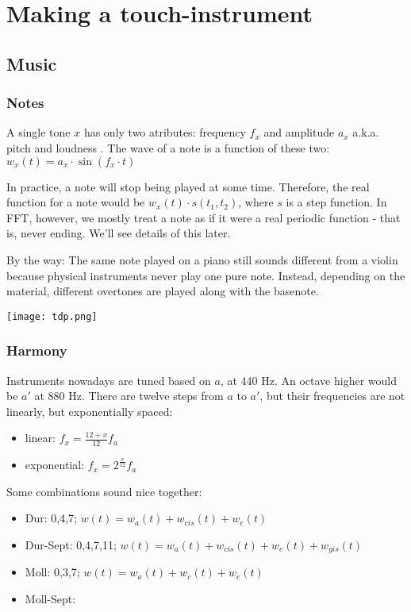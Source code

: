 
\section{Making a touch-instrument}

\subsection{Music}

\subsubsection{Notes}
A single tone $x$ has only two atributes: frequency $f_x$ and amplitude $a_x$ a.k.a. pitch and loudness . The wave of a note is a function of these two: $w_x(t) = a_x \cdot \sin( f_x \cdot t)$

In practice, a note will stop being played at some time. Therefore, the real function for a note would be $w_x(t) \cdot s(t_1, t_2)$, where $s$ is a step function. In FFT, however, we mostly treat a note as if it were a real periodic function - that is, never ending. We'll see details of this later. 

By the way: The same note played on a piano still sounds different from a violin because physical instruments never play one pure note. Instead, depending on the material, different overtones are played along with the basenote. 

\texttt{[image: tdp.png]}


\subsubsection{Harmony}
Instruments nowadays are tuned based on $a$, at 440 Hz. An octave higher would be $a'$ at 880 Hz. There are twelve steps from $a$ to $a'$, but their frequencies are not linearly, but exponentially spaced: 

\begin{itemize}
    \item linear: $f_x = \frac{12 + x}{12} f_a$
    \item exponential: $f_x = 2^{\frac{x}{12}} f_a$
\end{itemize}

Some combinations sound nice together:

\begin{itemize}
    \item Dur: {0,4,7}; $w(t) = w_a(t) + w_{cis}(t) + w_e(t)$
    \item Dur-Sept: {0,4,7,11}; $w(t) = w_a(t) + w_{cis}(t) + w_e(t) + w_{gis}(t)$
    \item Moll: {0,3,7}; $w(t) = w_a(t) + w_{c}(t) + w_e(t)$
    \item Moll-Sept: {}
\end{itemize}


